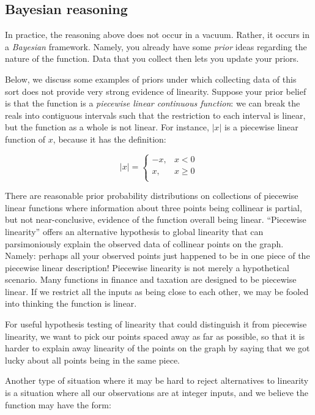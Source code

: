 \documentclass[10pt]{amsart}
\begin{document}
\subsection{Bayesian reasoning}

In practice, the reasoning above does not occur in a vacuum. Rather,
it occurs in a {\em Bayesian} framework. Namely, you already have some
{\em prior} ideas regarding the nature of the function. Data that you
collect then lets you update your priors.

Below, we discuss some examples of priors under which collecting data
of this sort does not provide very strong evidence of
linearity. Suppose your prior belief is that the function is a {\em
  piecewise linear continuous function}: we can break the reals into
contiguous intervals such that the restriction to each interval is
linear, but the function as a whole is not linear. For instance, $|x|$
is a piecewise linear function of $x$, because it has the definition:

$$|x| = \left\lbrace \begin{array}{rl} -x, & x < 0 \\ x, & x \ge 0 \\\end{array}\right.$$

There are reasonable prior probability distributions on collections of
piecewise linear functions where information about three points being
collinear is partial, but not near-conclusive, evidence of the
function overall being linear. ``Piecewise linearity'' offers an
alternative hypothesis to global linearity that can parsimoniously
explain the observed data of collinear points on the graph. Namely:
perhaps all your observed points just happened to be in one piece of
the piecewise linear description! Piecewise linearity is not merely a
hypothetical scenario. Many functions in finance and taxation are
designed to be piecewise linear. If we restrict all the inputs as
being close to each other, we may be fooled into thinking the function
is linear.

For useful hypothesis testing of linearity that could distinguish it
from piecewise linearity, we want to pick our points spaced away as
far as possible, so that it is harder to explain away linearity of the
points on the graph by saying that we got lucky about all points being
in the same piece.

Another type of situation where it may be hard to reject alternatives
to linearity is a situation where all our observations are at integer
inputs, and we believe the function may have the form:
\end{document}
